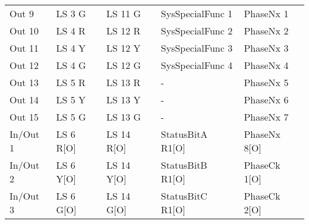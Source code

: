 \documentclass[]{article}
\begin{document}
\begin{table}[]
{\begin{tabular}{lllll}
			\rowcolor[HTML]{EFEFEF} 
			Out 9                             & LS 3 G                                       & LS 11 G                                         & SysSpecialFunc 1         & PhaseNx 1                                \\
			\rowcolor[HTML]{EFEFEF} 
			Out 10                            & LS 4 R                                       & LS 12 R                                         & SysSpecialFunc 2         & PhaseNx 2                                \\
			\rowcolor[HTML]{EFEFEF} 
			Out 11                            & LS 4 Y                                       & LS 12 Y                                         & SysSpecialFunc 3         & PhaseNx 3                                \\
			\rowcolor[HTML]{EFEFEF} 
			Out 12                            & LS 4 G                                       & LS 12 G                                         & SysSpecialFunc 4         & PhaseNx 4                                \\
			\rowcolor[HTML]{EFEFEF} 
			Out 13                            & LS 5 R                                       & LS 13 R                                         & -                        & PhaseNx 5                                \\
			\rowcolor[HTML]{EFEFEF} 
			Out 14                            & LS 5 Y                                       & LS 13 Y                                         & -                        & PhaseNx 6                                \\
			\rowcolor[HTML]{EFEFEF} 
			Out 15                            & LS 5 G                                       & LS 13 G                                         & -                        & PhaseNx 7                                \\
			\rowcolor[HTML]{EFEFEF} 
			In/Out 1                          & LS 6 R{[}O{]}                                & LS 14 R{[}O{]}                                  & StatusBitA R1{[}O{]}     & PhaseNx 8{[}O{]}                         \\
			\rowcolor[HTML]{EFEFEF} 
			In/Out 2                          & LS 6 Y{[}O{]}                                & LS 14 Y{[}O{]}                                  & StatusBitB R1{[}O{]}     & PhaseCk 1{[}O{]}                         \\
			\rowcolor[HTML]{EFEFEF} 
			In/Out 3                          & LS 6 G{[}O{]}                                & LS 14 G{[}O{]}                                  & StatusBitC R1{[}O{]}     & PhaseCk 2{[}O{]}                         \\

\end{tabular}}
\end{table}
\end{document}
